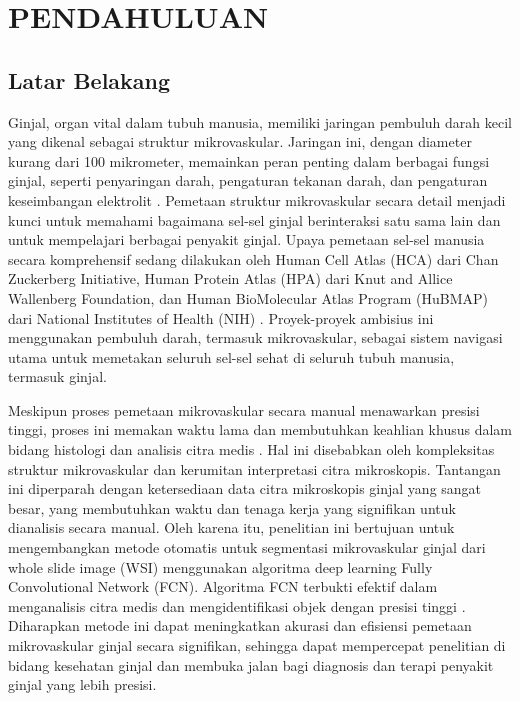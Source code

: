 \chapter{PENDAHULUAN}
\section{Latar Belakang}
\label{section:latarbelakang}
\noindent Ginjal, organ vital dalam tubuh manusia, memiliki jaringan pembuluh darah kecil yang dikenal sebagai struktur mikrovaskular. Jaringan ini, dengan diameter kurang dari 100 mikrometer, memainkan peran penting dalam berbagai fungsi ginjal, seperti penyaringan darah, pengaturan tekanan darah, dan pengaturan keseimbangan elektrolit \cite{hu_multi-scale_2023}. Pemetaan struktur mikrovaskular secara detail menjadi kunci untuk memahami bagaimana sel-sel ginjal berinteraksi satu sama lain dan untuk mempelajari berbagai penyakit ginjal.
Upaya pemetaan sel-sel manusia secara komprehensif sedang dilakukan oleh Human Cell Atlas (HCA) dari Chan Zuckerberg Initiative, Human Protein Atlas (HPA) dari Knut and Allice Wallenberg Foundation, dan Human BioMolecular Atlas Program (HuBMAP) dari National Institutes of Health (NIH) \cite{weber_considerations_2020}. Proyek-proyek ambisius ini menggunakan pembuluh darah, termasuk mikrovaskular, sebagai sistem navigasi utama untuk memetakan seluruh sel-sel sehat di seluruh tubuh manusia, termasuk ginjal.

\noindent Meskipun proses pemetaan mikrovaskular secara manual menawarkan presisi tinggi, proses ini memakan waktu lama dan membutuhkan keahlian khusus dalam bidang histologi dan analisis citra medis \cite{hu_multi-scale_2023,weber_considerations_2020}. Hal ini disebabkan oleh kompleksitas struktur mikrovaskular dan kerumitan interpretasi citra mikroskopis. Tantangan ini diperparah dengan ketersediaan data citra mikroskopis ginjal yang sangat besar, yang membutuhkan waktu dan tenaga kerja yang signifikan untuk dianalisis secara manual. Oleh karena itu, penelitian ini bertujuan untuk mengembangkan metode otomatis untuk segmentasi mikrovaskular ginjal dari whole slide image (WSI) menggunakan algoritma deep learning Fully Convolutional Network (FCN). Algoritma FCN terbukti efektif dalam menganalisis citra medis dan mengidentifikasi objek dengan presisi tinggi \cite{huang_fully_2022}. Diharapkan metode ini dapat meningkatkan akurasi dan efisiensi pemetaan mikrovaskular ginjal secara signifikan, sehingga dapat mempercepat penelitian di bidang kesehatan ginjal dan membuka jalan bagi diagnosis dan terapi penyakit ginjal yang lebih presisi. 


